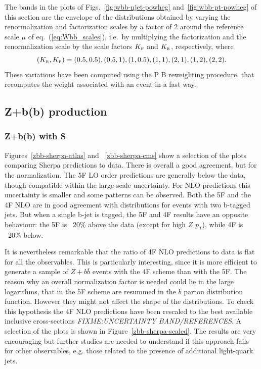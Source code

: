 \documentclass[11pt]{cernrep}
\newcommand{\Sherpa}{S\protect\scalebox{0.8}{HERPA}\xspace}
\newcommand{\pt}{\ensuremath{p_{T}}\xspace}
\newcommand\KRA{K_{\scriptscriptstyle \rm R}}
\newcommand\KFA{K_{\scriptscriptstyle \rm F}}
\newcommand{\POWHEGBOX}{P\protect\scalebox{0.8}{OWHEG} B\protect\scalebox{0.8}{OX}\xspace}
\begin{document}
\begin{enumerate}
The bands in the plots of Figs.~\ref{fig:wbb-njet-powheg}
and~\ref{fig:wbb-pt-powheg} of this section are the envelope of the
distributions obtained by varying the renormalization and factorization
scales by a factor of 2 around the reference scale $\mu$ of
eq.~(\ref{eq:Wbb_scales}), i.e.~by multiplying the factorization and the
renormalization scale by the scale factors $\KFA$ and $\KRA$, respectively,
where
\begin{equation}
\label{eq:KRA_KFA}
(\KRA,\KFA)=(0.5,0.5),  (0.5,1), (1,0.5), (1,1),(2,1),(1,2),(2,2).
\end{equation}
These variations have been computed using the \POWHEGBOX{} reweighting
procedure, that recomputes the weight associated with an event in a fast way.
\end{enumerate}

\subsection{Z+b(b) production \label{Zbb}}

\subsubsection{Z+b(b) with \Sherpa}

Figures~\ref{zbb-sherpa-atlas} and ~\ref{zbb-sherpa-cms} show a selection of
the plots comparing Sherpa predictions to data.  There is overall a good
agreement, but for the normalization. The 5F LO order predictions are
generally below the data, though compatible within the large scale
uncertainty. For NLO predictions this uncertainty is smaller and some
patterns can be observed. Both the 5F and the 4F NLO are in good agreement
with distributions for events with two b-tagged jets.  But when a single
b-jet is tagged, the 5F and 4F results have an opposite behaviour: the 5F is
~20\% above the data (except for high $Z$ \pt), while 4F is ~20\% below.

It is nevertheless remarkable that the ratio of 4F NLO predictions to data is
flat for all the observables. This is particularly interesting, since it is
more efficient to generate a sample of $Z+b\bar{b}$ events with the 4F scheme
than with the 5F. The reason why an overall normalization factor is needed
could lie in the large logarithms, that in the 5F scheme are resummed in the
$b$ parton distribution function. However they might not affect the shape of
the distributions. To check this hypothesis the 4F NLO predictions have been
rescaled to the best available inclusive cross-sections {\em
  FIXME:UNCERTAINTY BAND/REFERENCES}. A selection of the plots is shown in
Figure~\ref{zbb-sherpa-scaled}. The results are very encouraging but further
studies are needed to understand if this approach fails for other
observables, e.g. those related to the presence of additional light-quark
jets.
\end{document}
